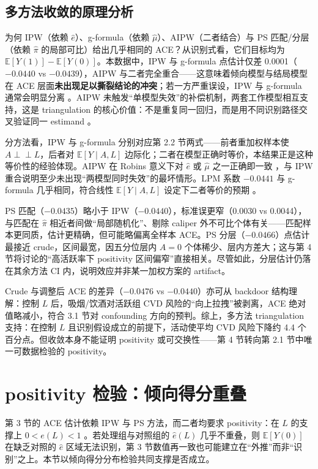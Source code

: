 \documentclass[12pt,a4paper]{article}
\newcommand{\E}{\mathbb{E}}
\newcommand{\indep}{\perp\!\!\!\perp}
\begin{document}
\subsection{多方法收敛的原理分析}

为何 IPW（依赖 $\hat e$）、g-formula（依赖 $\hat\mu$）、AIPW（二者结合）与 PS 匹配/分层（依赖 $\hat\pi$ 的局部可比）给出几乎相同的 ACE？从识别式看，它们目标均为 $\E[Y(1)]-\E[Y(0)]$。本数据中，IPW 与 g-formula 点估计仅差 0.0001（$-0.0440$ vs $-0.0439$），AIPW 与二者完全重合——这意味着倾向模型与结局模型在 ACE 层面\textbf{未出现足以撕裂结论的冲突}；若一方严重误设，IPW 与 g-formula 通常会明显分离 \cite{shahu2023comparison}。AIPW 未触发“单模型失效”的补偿机制，两套工作模型相互支持，这是 triangulation 的核心价值：不是重复同一回归，而是用不同识别路径交叉验证同一 estimand \cite{shahu2023comparison,hernan2024whatif}。

分方法看，IPW 与 g-formula 分别对应第 2.2 节两式——前者重加权样本使 $A\indep L$，后者对 $\E[Y\mid A,L]$ 边际化；二者在模型正确时等价，本结果正是这种等价性的经验体现。AIPW 在 Robins 意义下对 $\hat e$ 或 $\hat\mu$ 之一正确即一致 \cite{robins1994estimation}，与 IPW 重合说明至少未出现“两模型同时失效”的最坏情形。LPM 系数 $-0.0441$ 与 g-formula 几乎相同，符合线性 $\E[Y\mid A,L]$ 设定下二者等价的预期 \cite{hernan2024whatif}。

PS 匹配（$-0.0435$）略小于 IPW（$-0.0440$），标准误更窄（0.0030 vs 0.0044），与匹配在 $\hat\pi$ 相近者间做“局部随机化”、剔除 caliper 外不可比个体有关——匹配样本更同质，估计更精确，但可能略偏离全样本 ACE。PS 分层（$-0.0466$）点估计最接近 crude，区间最宽，因五分位层内 $A=0$ 个体稀少、层内方差大；这与第 4 节将讨论的“高活跃率下 positivity 区间偏窄”直接相关。尽管如此，分层估计仍落在其余方法 CI 内，说明效应并非某一加权方案的 artifact。

Crude 与调整后 ACE 的差异（$-0.0476$ vs $-0.0440$）亦可从 backdoor 结构理解：控制 $L$ 后，吸烟/饮酒对活跃组 CVD 风险的“向上拉拽”被剥离，ACE 绝对值略减小，符合 3.1 节对 confounding 方向的预判。综上，多方法 triangulation 支持：在控制 $L$ 且识别假设成立的前提下，活动使平均 CVD 风险下降约 4.4 个百分点。但收敛本身不能证明 positivity 或可交换性——第 4 节转向第 2.1 节中唯一可数据检验的 positivity。

\section{positivity 检验：倾向得分重叠}

第 3 节的 ACE 估计依赖 IPW 与 PS 方法，而二者均要求 positivity：在 $L$ 的支撑上 $0<e(L)<1$ \cite{hernan2024whatif,chen2024iptw}。若处理组与对照组的 $\hat e(L)$ 几乎不重叠，则 $\E[Y(0)]$ 在缺乏对照的 $\hat e$ 区域无法识别，第 3 节数值再一致也可能建立在“外推”而非“识别”之上。本节以倾向得分分布检验共同支撑是否成立。
\end{document}

